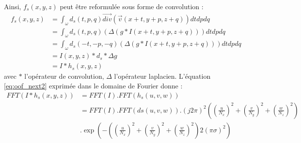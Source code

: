   Ainsi, $f_s(x,y,z)$ peut être reformulée sous forme de convolution :
  \begin{align}
    f_s(x,y,z) & = \int_{\omega} d_s(t,p,q) \vec{div}( \vec{v}(x+t,y+p, z+q) ) dtdpdq \\
              \nonumber
               & = \int_{\omega} d_s(t,p,q) (\Delta(g*I(x+t,y+p, z+q))) dtdpdq \\
               \nonumber
               & = \int_{\omega} d_s(-t,-p,-q) (\Delta(g*I(x+t,y+p, z+q))) dtdpdq \\
               \nonumber
               & = I(x,y,z) * d_s * \Delta g \\
               \nonumber
               & = I * h_s(x,y,z)
    \label{eq:oof_next2}
  \end{align}
  avec $*$ l'opérateur de convolution, $\Delta$ l'opérateur laplacien.
  L'équation \ref{eq:oof_next2} exprimée dans le domaine de Fourier donne :
  \begin{align}
    FFT( I * h_s(x,y,z) ) &= FFT(I) . FFT(h_s(u,v,w)) \\
                          \nonumber
                          &= FFT(I) . FFT(ds(u,v,w)) . (j2 \pi)^2 ( (\frac{u}{N_x})^2 + (\frac{v}{N_y})^2 + (\frac{w}{N_z})^2 )  \\
                          \nonumber
                          & . \exp( -( (\frac{u}{N_x})^2 + (\frac{v}{N_y})^2 + (\frac{w}{N_z})^2 ) 2(\pi\sigma)^2 )
  \end{align}
